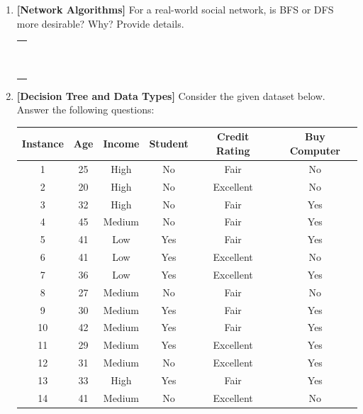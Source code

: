 \documentclass[11pt]{article}
\begin{document}
\begin{enumerate}
    \item \textbf{[Network Algorithms]} For a real-world social network, is BFS or DFS more desirable? Why? Provide details.\vspace{0.2cm}\\
     \begin{tabular}{ | m{15cm} | } 
     \hline
     \\ \\ \\ \\ \\ \\ \\  \\ \\ \\  
     \hline
    \end{tabular}
    \newpage
    \item \textbf{[Decision Tree and Data Types]}
    Consider the given dataset below. Answer the following questions:


    \begin{center}
     \begin{tabular}{|c|c| c| c| c|c|} 
     \hline
     \bf Instance & \bf Age & \bf Income & \bf Student & \bf Credit Rating & \bf Buy Computer \\ [0.5ex] 
     \hline\hline
     1 & 25 & High & No & Fair & No\\ 
     \hline
     2 & 20 & High & No & Excellent & No\\
     \hline
     3 &  32 & High & No & Fair & Yes\\
     \hline
     4 & 45 & Medium & No & Fair & Yes\\
     \hline
     5 & 41 & Low & Yes & Fair & Yes\\  
      \hline
     6 & 41 & Low & Yes & Excellent & No\\  
      \hline
     7 & 36 & Low & Yes & Excellent & Yes\\  
      \hline
     8 & 27 & Medium & No & Fair & No\\ 
      \hline
     9 & 30 & Medium & Yes & Fair & Yes\\ 
      \hline
     10 & 42 & Medium & Yes & Fair & Yes\\ 
     \hline
     11 & 29 & Medium & Yes & Excellent & Yes\\  
      \hline
     12 & 31 & Medium & No & Excellent & Yes\\  
      \hline
     13 & 33 & High & Yes & Fair & Yes\\ 
      \hline
     14 & 41 & Medium & No & Excellent & No\\ 
      \hline
    \end{tabular}
    \end{center}


\end{enumerate}
\end{document}
